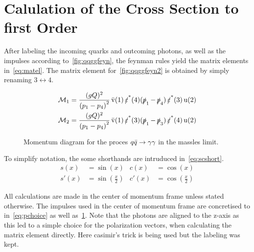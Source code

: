 \section{Calulation of the Cross Section to first Order}%
\label{sec:qqggcalc}

After labeling the incoming quarks and outcoming photons, as well as
the impulses according to~\ref{fig:qqggfeyn}, the feynman rules yield
the matrix elements in~\eqref{eq:matel}. The matrix element
for~\ref{fig:qqggfeyn2} is obtained by simply renaming
\(3\leftrightarrow 4\).

\begin{align}
  \label{eq:matel}
  \mathcal{M}_1 &= \frac{(gQ)^2}{\qty(p_1 - p_4)^2}\vsb(1)\pses(4)(\ps_1 -
                \ps_4)\pses(3)\us(2)\\
  \mathcal{M}_2 &= \frac{(gQ)^2}{\qty(p_1 - p_4)^2}\vsb(1)\pses(3)(\ps_1 - \ps_3)\pses(4)\us(2)
\end{align}

\begin{wrapfigure}{R}{0.4\textwidth}
\centering
{}
\caption{\label{fig:qqimpulses} Momentum diagram for the proces
  \(q\bar{q}\rightarrow\gamma\gamma\) in the massles limit.}
\end{wrapfigure}


To simplify notation, the some shorthands are intruduced
in~\eqref{eq:scshort}.
\begin{align}
  \label{eq:scshort}
  s(x) &= \sin(x) & c(x) &= \cos(x) \\ s'(x) &= \sin(\frac{x}{2}) & c'(x) &= \cos(\frac{x}{2})
\end{align}

All calculations are made in the center of momentum frame unless
stated otherwise.  The impulses used in the center of momentum frame
are concretised to in~\eqref{eq:pchoice} as well
as~\ref{fig:qqimpulses}.  Note that the photons are aligned to the
z-axis as this led to a simple choice for the polarization vectors,
when calculating the matrix element directly. Here casimir's trick is
being used but the labeling was kept.


